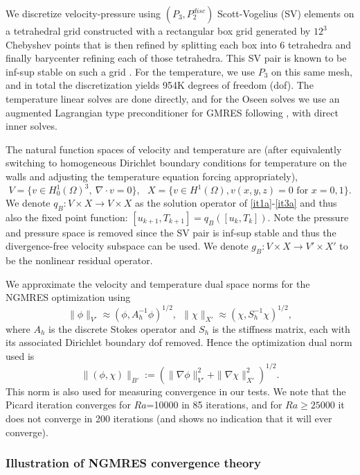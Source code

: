 \documentclass{article}
\numberwithin{equation}{section}
\begin{document}
We discretize velocity-pressure using $(P_3,P_2^{disc})$ Scott-Vogelius (SV) elements on a tetrahedral grid constructed with a rectangular box grid generated by $12^3$ Chebyshev points that is then refined by splitting each box into 6 tetrahedra and finally barycenter refining each of those tetrahedra.  This SV pair is known to be inf-sup stable on such a grid \cite{Z05}.  For the temperature, we use $P_3$ on this same mesh, and in total the discretization yields 954K degrees of freedom (dof).  The temperature linear solves are done directly, and for the Oseen solves we use an augmented Lagrangian type preconditioner for GMRES following \cite{benzi,HR13,BL12}, with direct inner solves.  

The natural function spaces of velocity and temperature are (after equivalently switching to homogeneous Dirichlet boundary conditions for temperature on the walls and adjusting the temperature equation forcing appropriately),
\[ 
V = \{ v\in H^1_0(\Omega)^3, \ \nabla \cdot v=0\},\ \ \
X = \{ v\in H^1(\Omega), v(x,y,z)=0 \mbox{ for } x=0,1\}.
\]
We denote $q_B: V\times X \rightarrow V\times X$ as the solution operator of \eqref{it1a}-\eqref{it3a} and thus also the fixed point function: $[u_{k+1},T_{k+1}]=q_B([u_k,T_k])$.  Note the pressure and pressure space is removed since the SV pair is inf-sup stable and thus the divergence-free velocity subspace can be used.  We denote $g_B: V\times X \rightarrow V'\times X'$ to be the nonlinear residual operator.

We approximate the velocity and temperature dual space norms for the NGMRES optimization using
\[
\| \phi \|_{V'} \approx (\phi,A_h^{-1} \phi)^{1/2},\ \ \| \chi \|_{X'} \approx (\chi,S_h^{-1} \chi)^{1/2},
\]
where $A_h$ is the discrete Stokes operator and $S_h$ is the stiffness matrix, each with its associated Dirichlet boundary dof removed.  Hence the optimization dual norm used is
\[
\| (\phi,\chi) \|_{B'} := \left( \| \nabla \phi \|_{V'}^2 + \| \nabla \chi \|_{X'}^2 \right)^{1/2}.
\]
This norm is also used for measuring convergence in our tests.  We note that the Picard iteration converges for $Ra$=10000 in 85 iterations, and for $Ra\ge 25000$ it does not converge in 200 iterations (and shows no indication that it will ever converge).  %

\subsubsection{Illustration of NGMRES convergence theory}
\end{document}
